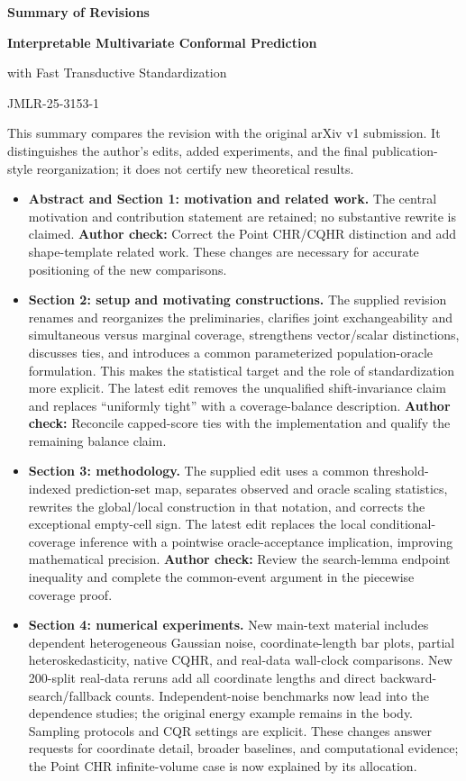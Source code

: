 \documentclass[10pt]{article}
\newcommand{\checkauthor}[1]{\textcolor{red!65!black}{\textbf{Author check:} #1}}
\begin{document}
\begin{center}
{\Large\bfseries Summary of Revisions}\par
\vspace{0.3em}
{\bfseries Interpretable Multivariate Conformal Prediction\par
with Fast Transductive Standardization}\par
JMLR-25-3153-1
\end{center}

This summary compares the revision with the original arXiv v1 submission.
It distinguishes the author's edits, added experiments, and the final
publication-style reorganization; it does not certify new theoretical results.

\begin{itemize}
\item \textbf{Abstract and Section 1: motivation and related work.}
The central motivation and contribution statement are retained; no substantive
rewrite is claimed. \checkauthor{Correct the Point CHR/CQHR distinction and
add shape-template related work.} These changes are necessary for accurate
positioning of the new comparisons.

\item \textbf{Section 2: setup and motivating constructions.}
The supplied revision renames and reorganizes the preliminaries, clarifies
joint exchangeability and simultaneous versus marginal coverage, strengthens
vector/scalar distinctions, discusses ties, and introduces a common
parameterized population-oracle formulation. This makes the statistical
target and the role of standardization more explicit.
The latest edit removes the unqualified shift-invariance claim and replaces
``uniformly tight'' with a coverage-balance description.
\checkauthor{Reconcile capped-score ties with the implementation and qualify
the remaining balance claim.}

\item \textbf{Section 3: methodology.}
The supplied edit uses a common threshold-indexed prediction-set map,
separates observed and oracle scaling statistics, rewrites the global/local
construction in that notation, and corrects the exceptional empty-cell sign.
The latest edit replaces the local conditional-coverage inference with a
pointwise oracle-acceptance implication, improving mathematical precision.
\checkauthor{Review the search-lemma endpoint inequality and complete the
common-event argument in the piecewise coverage proof.}

\item \textbf{Section 4: numerical experiments.}
New main-text material includes dependent heterogeneous Gaussian noise,
coordinate-length bar plots, partial heteroskedasticity, native CQHR, and
real-data wall-clock comparisons. New 200-split real-data reruns add all
coordinate lengths and direct backward-search/fallback counts. Independent-noise
benchmarks now lead into the dependence studies; the original energy example
remains in the body. Sampling protocols and CQR settings are explicit. These changes
answer requests for coordinate detail, broader baselines, and computational
evidence; the Point CHR infinite-volume case is now explained by its allocation.


\end{itemize}
\end{document}
